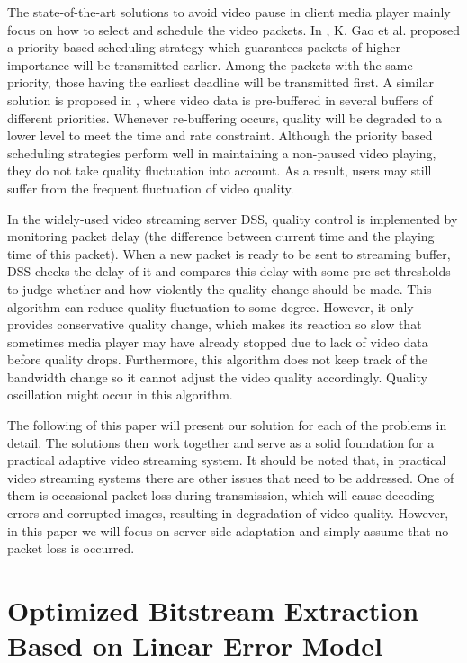 \documentclass[journal]{IEEEtran}
\begin{document}
The state-of-the-art solutions to avoid video pause in client media player mainly focus on how to select and schedule the video packets. In \cite{Gao06}, K. Gao et al. proposed a priority based scheduling strategy which guarantees packets of higher importance will be transmitted earlier. Among the packets with the same priority, those having the earliest deadline will be transmitted first. A similar solution is proposed in \cite{Schierl10}, where video data is pre-buffered in several buffers of different priorities. Whenever re-buffering occurs, quality will be degraded to a lower level to meet the time and rate constraint. Although the priority based scheduling strategies perform well in maintaining a non-paused video playing, they do not take quality fluctuation into account. As a result, users may still suffer from the frequent fluctuation of video quality.

In the widely-used video streaming server DSS, quality control is implemented by monitoring packet delay (the difference between current time and the playing time of this packet). When a new packet is ready to be sent to streaming buffer, DSS checks the delay of it and compares this delay with some pre-set thresholds to judge whether and how violently the quality change should be made. This algorithm can reduce quality fluctuation to some degree. However, it only provides conservative quality change, which makes its reaction so slow that sometimes media player may have already stopped due to lack of video data before quality drops. Furthermore, this algorithm does not keep track of the bandwidth change so it cannot adjust the video quality accordingly. Quality oscillation might occur in this algorithm.

The following of this paper will present our solution for each of the problems in detail. The solutions then work together and serve as a solid foundation for a practical adaptive video streaming system. It should be noted that, in practical video streaming systems there are other issues that need to be addressed. One of them is occasional packet loss during transmission, which will cause decoding errors and corrupted images, resulting in degradation of video quality. However, in this paper we will focus on server-side adaptation and simply assume that no packet loss is occurred.

\section{Optimized Bitstream Extraction Based on Linear Error Model}
\label{sec:bitstream-extraction}
\end{document}
